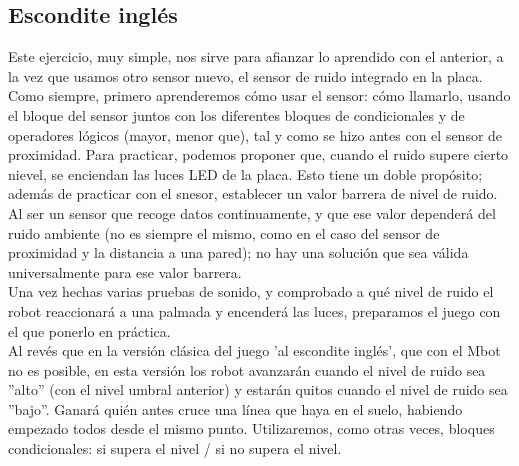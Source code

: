 \subsection{Escondite inglés}\label{ingles}
Este ejercicio, muy simple, nos sirve para afianzar lo aprendido con el anterior, a la vez que usamos otro sensor nuevo, el sensor de ruido integrado en la placa.\\
Como siempre, primero aprenderemos cómo usar el sensor: cómo llamarlo, usando el bloque del sensor juntos con los diferentes bloques de condicionales y de operadores lógicos (mayor, menor que), tal y como se hizo antes con el sensor de proximidad. Para practicar, podemos proponer que, cuando el ruido supere cierto nievel, se enciendan las luces LED de la placa. Esto tiene un doble propósito; además de practicar con el snesor, establecer un valor barrera de nivel de ruido. Al ser un sensor que recoge datos continuamente, y que ese valor dependerá del ruido ambiente (no es siempre el mismo, como en el caso del sensor de proximidad y la distancia a una pared); no hay una solución que sea válida universalmente para ese valor barrera. \\
Una vez hechas varias pruebas de sonido, y comprobado a qué nivel de ruido el robot reaccionará a una palmada y encenderá las luces, preparamos el juego con el que ponerlo en práctica. \\
Al revés que en la versión clásica del juego 'al escondite inglés', que con el Mbot no es posible, en esta versión los robot avanzarán cuando el nivel de ruido sea ''alto'' (con el nivel umbral anterior) y estarán quitos cuando el nivel de ruido sea ''bajo''. Ganará quién antes cruce una línea que haya en el suelo, habiendo empezado todos desde el mismo punto. Utilizaremos, como otras veces, bloques condicionales: si supera el nivel / si no supera el nivel.
